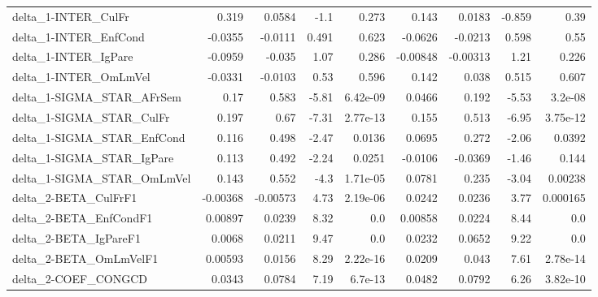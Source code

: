 \begin{tabular}{lrrrrrrrr}
delta\_1-INTER\_CulFr                   &       0.319 &       0.0584 &    -1.1 &    0.273 &      0.143 &      0.0183 &       -0.859 &          0.39 \\
delta\_1-INTER\_EnfCond                 &     -0.0355 &      -0.0111 &   0.491 &    0.623 &    -0.0626 &     -0.0213 &        0.598 &          0.55 \\
delta\_1-INTER\_IgPare                  &     -0.0959 &       -0.035 &    1.07 &    0.286 &   -0.00848 &    -0.00313 &         1.21 &         0.226 \\
delta\_1-INTER\_OmLmVel                 &     -0.0331 &      -0.0103 &    0.53 &    0.596 &      0.142 &       0.038 &        0.515 &         0.607 \\
delta\_1-SIGMA\_STAR\_AFrSem             &        0.17 &        0.583 &   -5.81 & 6.42e-09 &     0.0466 &       0.192 &        -5.53 &       3.2e-08 \\
delta\_1-SIGMA\_STAR\_CulFr              &       0.197 &         0.67 &   -7.31 & 2.77e-13 &      0.155 &       0.513 &        -6.95 &      3.75e-12 \\
delta\_1-SIGMA\_STAR\_EnfCond            &       0.116 &        0.498 &   -2.47 &   0.0136 &     0.0695 &       0.272 &        -2.06 &        0.0392 \\
delta\_1-SIGMA\_STAR\_IgPare             &       0.113 &        0.492 &   -2.24 &   0.0251 &    -0.0106 &     -0.0369 &        -1.46 &         0.144 \\
delta\_1-SIGMA\_STAR\_OmLmVel            &       0.143 &        0.552 &    -4.3 & 1.71e-05 &     0.0781 &       0.235 &        -3.04 &       0.00238 \\
delta\_2-BETA\_CulFrF1                  &    -0.00368 &     -0.00573 &    4.73 & 2.19e-06 &     0.0242 &      0.0236 &         3.77 &      0.000165 \\
delta\_2-BETA\_EnfCondF1                &     0.00897 &       0.0239 &    8.32 &      0.0 &    0.00858 &      0.0224 &         8.44 &           0.0 \\
delta\_2-BETA\_IgPareF1                 &      0.0068 &       0.0211 &    9.47 &      0.0 &     0.0232 &      0.0652 &         9.22 &           0.0 \\
delta\_2-BETA\_OmLmVelF1                &     0.00593 &       0.0156 &    8.29 & 2.22e-16 &     0.0209 &       0.043 &         7.61 &      2.78e-14 \\
delta\_2-COEF\_CONGCD                   &      0.0343 &       0.0784 &    7.19 &  6.7e-13 &     0.0482 &      0.0792 &         6.26 &      3.82e-10 \\

\end{tabular}
